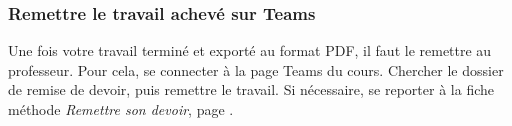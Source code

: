 \subsubsection{Remettre le travail achevé sur Teams}

Une fois votre travail terminé et exporté au format PDF, il faut le remettre au professeur. Pour cela, se connecter à la page Teams du cours. Chercher le dossier de remise de devoir, puis remettre le travail. Si nécessaire, se reporter à la fiche méthode \emph{Remettre son devoir}, page \pageref{TeamsRemettreDevoir}.  








%
%

